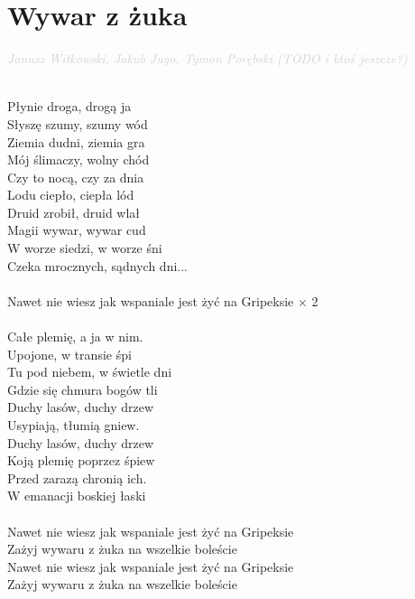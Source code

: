 \documentclass[a5paper, 10pt]{book}
\begin{document}
\newpage
\section{Wywar z żuka}\textcolor{lightgray}{\textit{Janusz Witkowski, Jakub Jugo, Tymon Porębski (TODO i ktoś jeszcze?)}}\\~\\
\begin{minipage}[t]{0.85\textwidth}
  Płynie droga, drogą ja             \\
  Słyszę szumy, szumy wód\\
  Ziemia dudni, ziemia gra      \\
  Mój ślimaczy, wolny chód   \\
  Czy to nocą, czy za dnia          \\
  Lodu ciepło, ciepła lód\\
  Druid zrobił, druid wlał             \\
  Magii wywar, wywar cud\\
  \hspace*{3mm}W worze siedzi, w worze śni     \\
  \hspace*{3mm}Czeka mrocznych, sądnych dni...\\
  \\
  \hspace*{6mm}Nawet nie wiesz jak wspaniale jest żyć na Gripeksie $\times$ 2 \\
  \\
  Całe plemię, a ja w nim.       \\
  Upojone, w transie śpi\\
  Tu pod niebem, w świetle dni\\
  Gdzie się chmura bogów tli   \\
  Duchy lasów, duchy drzew      \\
  Usypiają, tłumią gniew.      \\
  Duchy lasów, duchy drzew    \\
  Koją plemię poprzez śpiew    \\
  \hspace*{3mm}Przed zarazą chronią ich.       \\
  \hspace*{3mm}W emanacji boskiej łaski\\
  \\
  \hspace*{6mm}Nawet nie wiesz jak wspaniale jest żyć na Gripeksie        \\
  \hspace*{6mm}Zażyj wywaru z żuka na wszelkie boleście           	       \\
  \hspace*{6mm}Nawet nie wiesz jak wspaniale jest żyć na Gripeksie        \\
  \hspace*{6mm}Zażyj wywaru z żuka na wszelkie boleście   \\


\end{minipage}
\end{document}
